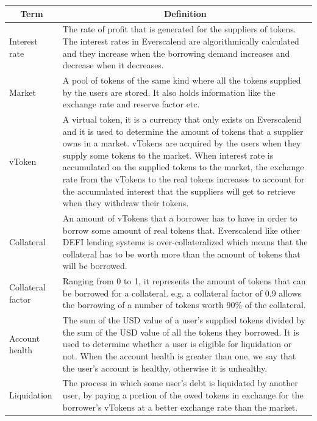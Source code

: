 \begin{tabularx}{\linewidth}{|l|X|}
  \hline
  \multicolumn{1}{|c|}{\textbf{Term}} & \multicolumn{1}{c|}{\textbf{Definition}} \\\hline
  \endhead

  Interest rate & The rate of profit that is generated for the suppliers of tokens. The interest rates in Everscalend are algorithmically calculated and they increase when the borrowing demand increases and decrease when it decreases. \\\hline

  Market & A pool of tokens of the same kind where all the tokens supplied by the users are stored. It also holds information like the exchange rate and reserve factor etc. \\\hline

  vToken & A virtual token, it is a currency that only exists on Everscalend and it is used to determine the amount of tokens that a supplier owns in a market. vTokens are acquired by the users when they supply some tokens to the market. When interest rate is accumulated on the supplied tokens to the market, the exchange rate from the vTokens to the real tokens increases to account for the accumulated interest that the suppliers will get to retrieve when they withdraw their tokens. \\\hline

  Collateral & An amount of vTokens that a borrower has to have in order to borrow some amount of real tokens that. Everscalend like other DEFI lending systems is over-collateralized which means that the collateral has to be worth more than the amount of tokens that will be borrowed. \\\hline

  Collateral factor & Ranging from 0 to 1, it represents the amount of tokens that can be borrowed for a collateral. e.g. a collateral factor of 0.9 allows the borrowing of a number of tokens worth $90\%$ of the collateral. \\\hline

  Account health & The sum of the USD value of a user's supplied tokens divided by the sum of the USD value of all the tokens they borrowed. It is used to determine whether a user is eligible for liquidation or not. When the account health is greater than one, we say that the user's account is healthy, otherwise it is unhealthy. \\\hline

  Liquidation & The process in which some user's debt is liquidated by another user, by paying a portion of the owed tokens in exchange for the borrower's vTokens at a better exchange rate than the market. \\\hline


\end{tabularx}
